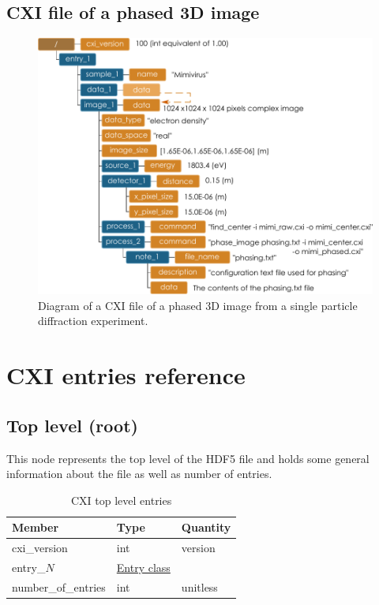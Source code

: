 \documentclass[usletter,11pt]{article}
\begin{document}
\clearpage
\subsection{CXI file of a phased 3D image}

\begin{figure}[h!]
\centering
\includegraphics[width=\textwidth]{phased_image.pdf}
\caption{Diagram of a CXI file of a phased 3D image from a single
particle diffraction experiment.}
\label{fig:phased_image}
\end{figure}

\clearpage

\section{CXI entries reference}

\subsection{Top level (root)}
\label{table:top}

This node represents the top level of the HDF5 file and holds some
general information about the file as well as number of entries.

\begin{table}[h!]\sffamily
\footnotesize
\caption{CXI top level entries}

\begin{tabular}{p{4.5cm} p{4.5cm}  p{2.5cm}}
\toprule
\bfseries Member     & \bfseries Type & \bfseries Quantity \\
\midrule

cxi\_version & int & version  \\
entry\_$N$ &  \hyperref[table:entry]{Entry class} & \\
number\_of\_entries & int & unitless \\
\bottomrule
\end{tabular}
\end{table}
\end{document}
